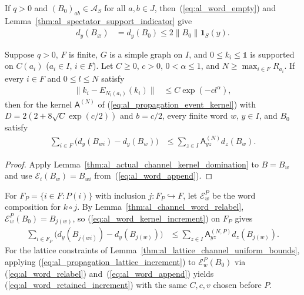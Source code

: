 If $q>0$ and $(B_0)_{ab}\in\mathcal A_S$ for all $a,b\in J$,
then~(\ref{eq:al_word_empty}) and
Lemma~\ref{thm:al_spectator_support_indicator} give
\begin{align}
    \label{eq:al_word_initial_support}
    d_y(B_{\varnothing}) & =d_y(B_0)\le2\|B_0\|\mathbf1_S(y).
\end{align}

\begin{lemma}
    \label{thm:al_channel_word_kernel_increment}
    \leanok
    Suppose $q>0$, $F$ is finite, $G$ is a simple graph on $I$, and
    $0\le k_i\le\mathbb 1$ is supported on $C(a_i)$ ($a_i\in I$, $i\in F$).
    Let $C\ge0$, $c>0$, $0<\alpha\le1$, and $N\ge\max_{i\in F}R_{a_i}$. If
    every $i\in F$ and $0\le l\le N$ satisfy
    \begin{align}
        \label{eq:al_word_localization_error}
        \|k_i-E_{N_l(a_i)}(k_i)\| & \le C\exp(-cl^\alpha),
    \end{align}
    then for the kernel $\mathsf A^{(N)}$ of
    (\ref{eq:al_propagation_event_kernel}) with
    $D=2(2+8\sqrt C\exp(c/2))$ and $b=c/2$, every finite word $w$, $y\in I$,
    and $B_0$ satisfy
    \begin{align}
        \label{eq:al_word_kernel_increment}
        \sum_{i\in F}\bigl(d_y(B_{wi})-d_y(B_w)\bigr)
         & \le\sum_{z\in I}\mathsf A^{(N)}_{yz}d_z(B_w).
    \end{align}
\end{lemma}
\begin{proof}
    \leanok
    Apply Lemma~\ref{thm:al_actual_channel_kernel_domination} to $B=B_w$ and
    use $\mathcal E_i(B_w)=B_{wi}$ from~(\ref{eq:al_word_append}).
\end{proof}

For $F_P=\{i\in F:P(i)\}$ with inclusion $j:F_P\hookrightarrow F$, let
$\mathcal E_w^P$ be the word composition for $k\circ j$. By
Lemma~\ref{thm:al_channel_word_relabel},
$\mathcal E_w^P(B_0)=B_{j(w)}$, so
(\ref{eq:al_word_kernel_increment}) on $F_P$ gives
\begin{align}
    \label{eq:al_word_retained_increment}
    \sum_{i\in F_P}\bigl(d_y(B_{j(wi)})-d_y(B_{j(w)})\bigr)
     & \le\sum_{z\in I}\mathsf A^{(N,P)}_{yz}d_z(B_{j(w)}).
\end{align}
For the lattice constraints of
Lemma~\ref{thm:al_lattice_channel_uniform_bounds}, applying
(\ref{eq:al_propagation_lattice_increment}) to $\mathcal E_w^P(B_0)$ via
(\ref{eq:al_word_relabel}) and~(\ref{eq:al_word_append}) yields
(\ref{eq:al_word_retained_increment}) with the same $C,c,v$ chosen before $P$.

